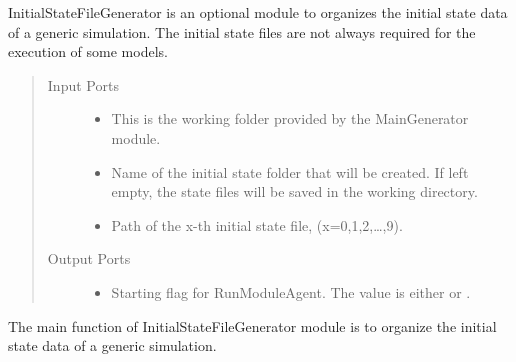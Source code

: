 \documentclass[letterpaper,10pt,english]{sphinxmanual}
\begin{document}
\begin{fulllineitems}
\label{\detokenize{AgentTools.GenericModelAgent:AgentTools.GenericModelAgent.InitialStateFileGenerator.InitialStateFileGenerator}}
InitialStateFileGenerator is an optional module to organizes the initial state data of a generic simulation.
The initial state files are not always required for the execution of some models.
\begin{quote}\begin{description}
\item[{Input Ports}] \leavevmode\begin{itemize}
\item {} 
 This is the working folder provided by the MainGenerator module.

\item {} 
 Name of the initial state folder that will be created. If left empty, the state files will be saved in the working directory.

\item {} 
 Path of the x-th initial state file, (x=0,1,2,…,9).

\end{itemize}

\item[{Output Ports}] \leavevmode\begin{itemize}
\item {} 
 Starting flag for RunModuleAgent. The value is either  or .

\end{itemize}

\end{description}\end{quote}

\begin{fulllineitems}
\label{\detokenize{AgentTools.GenericModelAgent:AgentTools.GenericModelAgent.InitialStateFileGenerator.InitialStateFileGenerator.compute}}
The main function of InitialStateFileGenerator module is to organize the initial state data of a generic simulation.


\end{fulllineitems}
\end{fulllineitems}
\end{document}
